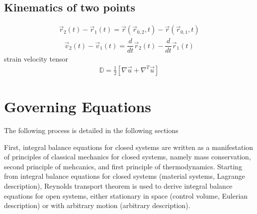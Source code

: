 \documentclass[letterpaper,10pt,english]{jupyterBook}
\begin{document}
\section{Kinematics of two points}
\label{\detokenize{ch/continuum/kinematics:kinematics-of-two-points}}\label{\detokenize{ch/continuum/kinematics:kinematics-two-points}}\begin{equation*}
\begin{split}\vec{r}_2(t) - \vec{r}_1(t) = \vec{r}\left(\vec{r}_{0,2}, t \right) - \vec{r}\left(\vec{r}_{0,1}, t \right)\end{split}
\end{equation*}\begin{equation*}
\begin{split}\vec{v}_2(t) - \vec{v}_1(t) = \dfrac{d}{dt} \vec{r}_2(t) - \dfrac{d}{dt} \vec{r}_1(t)\end{split}
\end{equation*}
\sphinxAtStartPar
strain velocity tensor
\begin{equation}\label{equation:ch/continuum/kinematics:eq:strain-vel-tensor}
\begin{split}\mathbb{D} = \frac{1}{2} \left[ \nabla \vec{u} + \nabla^T \vec{u} \right]\end{split}
\end{equation}
\sphinxstepscope


\chapter{Governing Equations}
\label{\detokenize{ch/continuum/governing-equations:governing-equations}}\label{\detokenize{ch/continuum/governing-equations:continuum-governing-equations}}\label{\detokenize{ch/continuum/governing-equations::doc}}
\sphinxAtStartPar
The following process is detailed in the following sections

\sphinxAtStartPar
{} First, integral balance equations for closed systems are written as a manifestation of principles of classical mechanics for closed systems, namely mass conservation, second principle of mehcanics, and first principle of thermodynamics. Starting from integral balance equations for closed systems (material systems, Lagrange description), Reynolds transport theorem is used to derive integral balance equations for open systems, either stationary in space (control volume, Eulerian description) or with arbitrary motion (arbitrary description).
\end{document}
